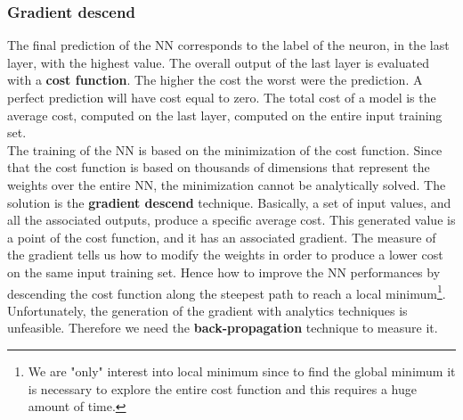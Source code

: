 \subsubsection*{Gradient descend}
The final prediction of the NN corresponds to the label of the neuron, in the last layer, with the highest value. The overall output of the last layer is evaluated with a \textbf{cost function}. The higher the cost the worst were the prediction. A perfect prediction will have cost equal to zero. The total cost of a model is the average cost, computed on the last layer, computed on the entire input training set.\\
The training of the NN is based on the minimization of the cost function. Since that the cost function is based on thousands of dimensions that represent the weights over the entire NN, the minimization cannot be analytically solved. The solution is the \textbf{gradient descend} technique. Basically, a set of input values, and all the associated outputs, produce a specific average cost. This generated value is a point of the cost function, and it has an associated gradient. The measure of the gradient tells us how to modify the weights in order to produce a lower cost on the same input training set. Hence how to improve the NN performances by descending the cost function along the steepest path to reach a local minimum\footnote{We are "only" interest into local minimum since to find the global minimum it is necessary to explore the entire cost function and this requires a huge amount of time.}.\\
Unfortunately, the generation of the gradient with analytics techniques is unfeasible. Therefore we need the \textbf{back-propagation} technique to measure it.

